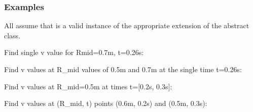 \documentclass[letterpaper,10pt,english]{sphinxmanual}
\begin{document}
\begin{fulllineitems}
\begin{fulllineitems}
\begin{quote}
\begin{description}
\begin{itemize}
\end{itemize}


\end{description}\end{quote}
\subsubsection*{Examples}

All assume that  is a valid instance of the appropriate
extension of the {\hyperref[\detokenize{eqtools:eqtools.core.Equilibrium}]{}} abstract class.

Find single v value for Rmid=0.7m, t=0.26s:

\begin{sphinxVerbatim}[commandchars=\\\{\}]
   
\end{sphinxVerbatim}

Find v values at R\_mid values of 0.5m and 0.7m at the single time
t=0.26s:

\begin{sphinxVerbatim}[commandchars=\\\{\}]
  \PYG{p}{[} \PYG{p}{]} 
\end{sphinxVerbatim}

Find v values at R\_mid=0.5m at times t={[}0.2s, 0.3s{]}:

\begin{sphinxVerbatim}[commandchars=\\\{\}]
   \PYG{p}{[} \PYG{p}{]}
\end{sphinxVerbatim}

Find v values at (R\_mid, t) points (0.6m, 0.2s) and (0.5m, 0.3s):

\begin{sphinxVerbatim}[commandchars=\\\{\}]
  \PYG{p}{[} \PYG{p}{]} \PYG{p}{[} \PYG{p}{]} 
\end{sphinxVerbatim}


\end{fulllineitems}
\end{fulllineitems}
\end{document}
